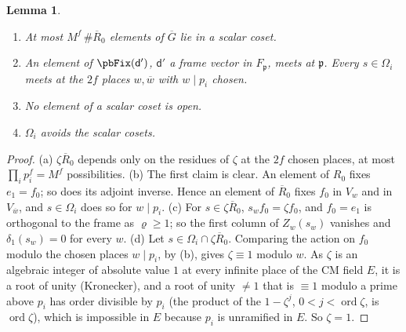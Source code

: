 \documentclass[10pt]{amsart}
\newtheorem{lemma}[theorem]{Lemma}
\theoremstyle{definition}
\theoremstyle{remark}
\providecommand{\auG}{\overline G}
\providecommand{\aubar}[1]{\overline{#1}}
\providecommand{\pbR}{\overline R_0}
\begin{document}
\begin{lemma}\label{pb:elem}
\begin{enumerate}
\item[(a)] At most $M^f\,\#\pbR$ elements of $\auG$ lie in a scalar coset.
\item[(b)] An element of $\pbFix(\mathsf d')$, $\mathsf d'$ a frame vector in $F_{\mathfrak p}$,
meets at $\mathfrak p$. Every $s\in\Omega_i$ meets at the $2f$ places $w,\aubar w$ with $w\mid
p_i$ chosen.
\item[(c)] No element of a scalar coset is open.
\item[(d)] $\Omega_i$ avoids the scalar cosets.
\end{enumerate}
\end{lemma}
\begin{proof}
(a) $\zeta\pbR$ depends only on the residues of $\zeta$ at the $2f$ chosen places, at most $\prod_i
p_i^f=M^f$ possibilities. (b) The first claim is clear. An element of $R_0$ fixes $e_1=f_0$; so
does its adjoint inverse. Hence an element of $\pbR$ fixes $f_0$ in $V_w$ and in $V_{\aubar w}$,
and $s\in\Omega_i$ does so for $w\mid p_i$. (c) For $s\in\zeta\pbR$, $s_wf_0=\zeta f_0$, and $f_0=
e_1$ is orthogonal to the frame as $\varrho\ge1$; so the first column of $Z_w(s_w)$ vanishes and
$\delta_1(s_w)=0$ for every $w$. (d) Let $s\in\Omega_i\cap\zeta\pbR$. Comparing the action on $f_0$
modulo the chosen places $w\mid p_i$, by (b), gives $\zeta\equiv1$ modulo $w$. As $\zeta$ is an
algebraic integer of absolute value $1$ at every infinite place of the CM field $E$, it is a root
of unity (Kronecker), and a root of unity $\ne1$ that is $\equiv1$ modulo a prime above $p_i$ has
order divisible by $p_i$ (the product of the $1-\zeta^j$, $0<j<\operatorname{ord}\zeta$, is
$\operatorname{ord}\zeta$), which is impossible in $E$ because $p_i$ is unramified in $E$. So
$\zeta=1$.
\end{proof}
\end{document}
